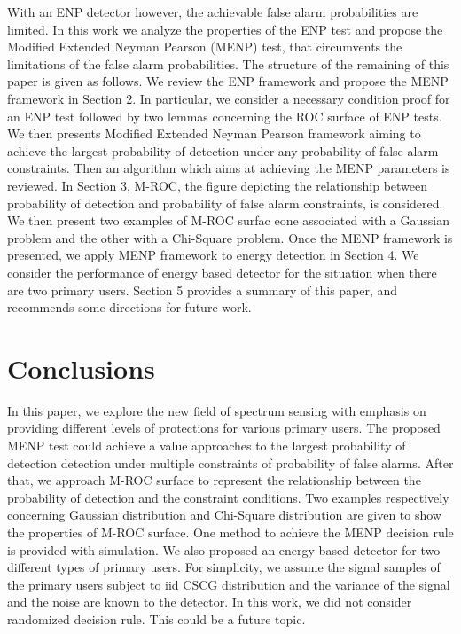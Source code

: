 \documentclass[12pt,journal,a4paper,twoside,onecolumn]{IEEEtran}
\begin{document}
\begin{spacing}{2}
With an ENP detector however, the achievable false alarm probabilities are limited. In this work we analyze the properties of the ENP test and propose the Modified Extended Neyman Pearson (MENP) test, that circumvents the limitations of the false alarm probabilities. The structure of the remaining of this paper is given as follows.
We review the ENP framework and propose the MENP framework in Section 2. In particular,  we consider  a necessary condition proof for an  ENP test followed by  two lemmas concerning the ROC surface of ENP tests. 
We then presents Modified Extended Neyman Pearson framework aiming to  achieve the largest probability of detection  under any probability of false alarm constraints.
Then an algorithm which aims at achieving the MENP parameters is reviewed. 
In Section 3, M-ROC, the figure depicting the relationship between probability of detection and probability of false alarm constraints, is considered.  We then present two examples of M-ROC surfac eone associated with a Gaussian problem and the other with a Chi-Square problem. 
Once the MENP framework is presented, we apply MENP framework to energy detection in Section 4. We consider  the performance of energy based detector for the situation when there are two primary users.  
Section 5 provides a summary of this paper, and recommends some directions for future work.  
\typeout{}


\typeout{}



\typeout{}


\section{Conclusions}
In this paper, we explore the new field of spectrum sensing with emphasis on providing different levels of protections for various primary users. 
The proposed MENP test could achieve a value approaches to the largest probability of detection detection under multiple constraints of probability of false alarms. 
After that, we approach M-ROC surface to represent the relationship between the probability of detection and the constraint conditions. Two examples respectively concerning Gaussian distribution and Chi-Square distribution are given to show the properties of M-ROC surface. 
One method to achieve the MENP decision rule is provided with simulation. 
We also proposed an energy based detector for two different types of primary users.
For simplicity, we assume the signal samples of the primary users subject to iid CSCG distribution and the variance of the signal and the noise are known to the detector.
In this work, we did not consider randomized decision rule. This could be a future topic.



\end{spacing}
\end{document}
